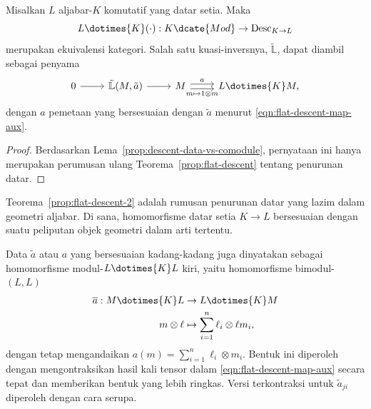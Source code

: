 \begin{theorem}\label{prop:flat-descent-2}
	Misalkan $L$ aljabar-$K$ komutatif yang datar setia. Maka
	\[ L \dotimes{K} (\cdot): K\dcate{Mod} \to \mathrm{Desc}_{K \to L} \]
	merupakan ekuivalensi kategori. Salah satu kuasi-inversnya,
	$\tilde{\mathbb{L}}$, dapat diambil sebagai penyama
	\[\begin{tikzcd}
		0 \arrow[r] & \tilde{\mathbb{L}}(M, \tilde{a}) \arrow[r] & M \arrow[shift left, r, "a"] \arrow[shift right, r, "{m \mapsto 1 \otimes m}"'] & L \dotimes{K} M,
	\end{tikzcd}\]
	dengan $a$ pemetaan yang bersesuaian dengan $\tilde a$ menurut
	\eqref{eqn:flat-descent-map-aux}.
\end{theorem}
\begin{proof}
	Berdasarkan Lema~\ref{prop:descent-data-vs-comodule}, pernyataan ini hanya
	merupakan perumusan ulang Teorema~\ref{prop:flat-descent} tentang penurunan
	datar.
\end{proof}

Teorema~\ref{prop:flat-descent-2} adalah rumusan penurunan datar yang lazim
dalam geometri aljabar. Di sana, homomorfisme datar setia $K\to L$
bersesuaian dengan suatu peliputan objek geometri dalam arti tertentu.

Data $\tilde a$ atau $a$ yang bersesuaian kadang-kadang juga dinyatakan
sebagai homomorfisme modul-$L\dotimes{K}L$ kiri, yaitu homomorfisme
bimodul-$(L,L)$
\begin{align*}
	\overline{a}: M \dotimes{K} L & \to L \dotimes{K} M \\
	m \otimes \ell & \mapsto \sum_{i=1}^n \ell_i \otimes \ell m_i,
\end{align*}
dengan tetap mengandaikan
$a(m)=\sum_{i=1}^n\ell_i\otimes m_i$. Bentuk ini diperoleh dengan
mengontraksikan hasil kali tensor dalam \eqref{eqn:flat-descent-map-aux} secara
tepat dan memberikan bentuk yang lebih ringkas. Versi terkontraksi untuk
$\tilde a_{ji}$ diperoleh dengan cara serupa.

